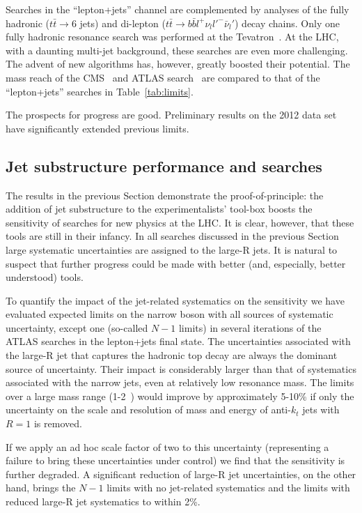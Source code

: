 Searches in the ``lepton+jets'' channel are complemented by analyses of the fully hadronic
($t\bar{t} \rightarrow 6$ jets) and di-lepton ($t\bar{t} \rightarrow b \bar{b} l^+ \nu_l l'^- \bar{\nu}_l'$) decay chains. 
Only one fully hadronic \ttbar{} resonance search was performed at the Tevatron~\cite{Aaltonen:2011vi}.
At the LHC, with a daunting multi-jet background, these searches are even more challenging. 
The advent of new algorithms has, however, greatly boosted their potential. The mass reach of the
CMS~\cite{Chatrchyan:2012ku} and ATLAS search~\cite{Aad:2012raa} are compared to that of the
``lepton+jets'' searches in Table~\ref{tab:limits}. 

The prospects for progress are good. Preliminary results on the 2012 data 
set~\cite{ATLAS-CONF-2013-052,CMS-PAS-B2G-12-005,CMS-PAS-B2G-12-006} 
have significantly extended previous limits.

\subsection{Jet substructure performance and searches}

The results in the previous Section demonstrate the proof-of-principle: 
the addition of jet substructure to the experimentalists' tool-box 
boosts the sensitivity of searches for new physics at the LHC. 
It is clear, however, that these tools are
still in their infancy. In all searches discussed in the previous Section 
large systematic uncertainties are assigned to the large-R jets. 
It is natural to suspect that further progress could be made with better 
(and, especially, better understood) tools. 

To quantify the impact of the jet-related systematics on the sensitivity we
have evaluated expected limits on the narrow \Zprime{} boson with all sources
of systematic uncertainty, except one (so-called $N-1$ limits) in several
iterations of the ATLAS searches in the lepton+jets final state. The
uncertainties associated with the large-R jet that captures the 
hadronic top decay are always the dominant source of uncertainty. 
Their impact is considerably larger than that of systematics 
associated with the narrow jets, even at relatively low resonance mass.
The limits
over a large mass range (1-2~\tev{}) would improve by approximately 5-10\% if 
only the uncertainty on the scale and resolution of mass and energy of
anti-$k_t$ jets with $R=1$ is removed. 

If we apply an ad hoc scale factor
of two to this uncertainty (representing a failure to bring these
uncertainties under control) we find that the sensitivity is further degraded. 
A significant reduction of large-R 
jet uncertainties, on the other hand,
brings the $N-1$ limits with no jet-related systematics and the 
limits with reduced large-R jet systematics to within
2\%. 


